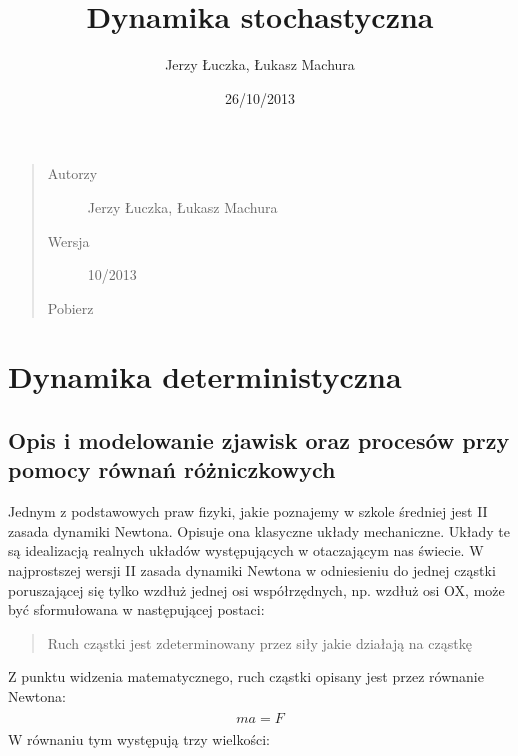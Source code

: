 \documentclass[a4paper,12pt,polish]{sphinxmanual}
\title{Dynamika stochastyczna}
\date{26/10/2013}
\author{Jerzy Łuczka, Łukasz Machura}
\begin{document}
\maketitle
\tableofcontents
{}\label{index::doc}

\begin{quote}\begin{description}
\item[{Autorzy}] \leavevmode
Jerzy Łuczka,
Łukasz Machura

\item[{Wersja}]  10/2013

\item[{Pobierz}] \leavevmode
{}

\end{description}\end{quote}


\chapter{Dynamika deterministyczna}
\label{index:dynamika-stochastyczna}\label{index:dynamika-deterministyczna}

\section{Opis i modelowanie zjawisk oraz procesów przy pomocy równań różniczkowych}
\label{ch1/chI011:opis-i-modelowanie-zjawisk-oraz-procesow-przy-pomocy-rownan-rozniczkowych}\label{ch1/chI011::doc}
Jednym z podstawowych praw fizyki, jakie poznajemy w szkole średniej jest II zasada dynamiki Newtona. Opisuje ona klasyczne układy mechaniczne. Układy te są idealizacją realnych układów występujących w otaczającym nas świecie. W najprostszej wersji II zasada dynamiki Newtona w odniesieniu do jednej cząstki poruszającej się tylko wzdłuż jednej osi współrzędnych, np. wzdłuż osi OX, może być sformułowana w następującej postaci:
\begin{quote}

Ruch cząstki jest zdeterminowany przez siły jakie działają na cząstkę
\end{quote}

Z punktu widzenia matematycznego, ruch cząstki opisany jest przez równanie Newtona:
\label{ch1/chI011:equation-eqn1}\begin{gather}
\begin{split}m a = F\end{split}\label{ch1/chI011-eqn1}
\end{gather}
W równaniu tym występują trzy wielkości:
\end{document}

